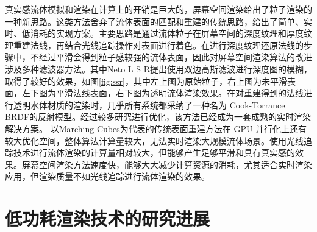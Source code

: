 \indent 真实感流体模拟和渲染在计算上的开销是巨大的，屏幕空间渲染\cite{van2009screen}给出了粒子渲染的一种新思路。这类方法舍弃了流体表面的匹配和重建的传统思路，给出了简单、实时、低消耗的实现方案。主要思路是通过流体粒子在屏幕空间的深度纹理和厚度纹理重建法线，再结合光线追踪操作对表面进行着色。在进行深度纹理还原法线的步骤中，不经过平滑会得到粒子感较强的流体表面，因此对屏幕空间渲染算法的改进涉及多种滤波器方法\cite{muller2007screen, bagar2010layered, neto2017real, truong2018narrow, oliveira2022narrow}。其中Neto L S R\cite{neto2017real}提出使用双边高斯滤波进行深度图的模糊，取得了较好的效果，如图\ref{fig:ssr}，其中左上图为原始粒子，右上图为未平滑表面，左下图为平滑法线表面，右下图为透明流体渲染效果。在对重建得到的法线进行透明水体材质的渲染时，几乎所有系统都采纳了一种名为 Cook-Torrance BRDF\cite{cook1982reflectance}的反射模型。经过较多研究进行优化\cite{schlick1994inexpensive, burley2012physically}，该方法已经成为一套成熟的实时渲染解决方案。
\newline
\indent 以Marching Cubes为代表的传统表面重建方法在 GPU 并行化上还有较大优化空间，整体算法计算量较大，无法实时渲染大规模流体场景。使用光线追踪技术进行流体渲染的计算量相对较大，但能够产生足够平滑和具有真实感的效果。屏幕空间渲染方法速度快，能够大大减少计算资源的消耗，尤其适合实时渲染应用，但渲染质量不如光线追踪进行流体渲染的效果。

\section{低功耗渲染技术的研究进展}

